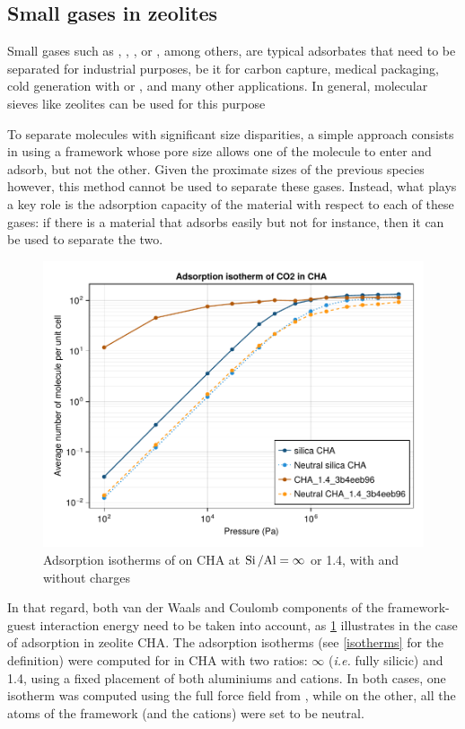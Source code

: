 \documentclass[main.tex]{subfiles}
\begin{document}
\subsection{Small gases in zeolites}

Small gases such as , , ,  or , among others, are typical adsorbates that need to be separated for industrial purposes, be it for carbon capture, medical  packaging, cold generation with  or , and many other applications. In general, molecular sieves like zeolites can be used for this purpose

To separate molecules with significant size disparities, a simple approach consists in using a framework whose pore size allows one of the molecule to enter and adsorb, but not the other. Given the proximate sizes of the previous species however, this method cannot be used to separate these gases. Instead, what plays a key role is the adsorption capacity of the material with respect to each of these gases: if there is a material that adsorbs  easily but not  for instance, then it can be used to separate the two.

\begin{figure}
	\centering
	\includegraphics[width=\linewidth]{figures/gcmc/CO2CHANeutral.pdf}

	\caption{Adsorption isotherms of  on CHA at $\mbox{Si\,/Al} = \infty$ or \num{1.4}, with and without charges}\label{fig:CO2CHANeutral}
\end{figure}

In that regard, both van der Waals and Coulomb components of the framework-guest interaction energy need to be taken into account, as \cref{fig:CO2CHANeutral} illustrates in the case of  adsorption in zeolite CHA. The adsorption isotherms (see \cref{isotherms} for the definition) were computed for  in CHA with two \SiAl ratios: $\infty$ (\textit{i.e.} fully silicic) and \num{1.4}, using a fixed placement of both aluminiums and cations. In both cases, one isotherm was computed using the full force field from \textcite{BoulfelfelSholl2021}, while on the other, all the atoms of the framework (and the cations) were set to be neutral.
\end{document}
